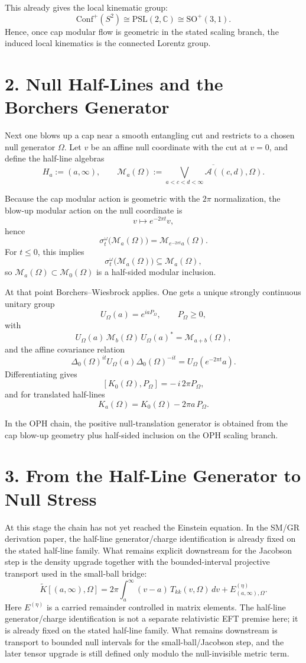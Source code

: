 \documentclass[10pt]{article}
\newcommand{\Conf}{\mathrm{Conf}}
\begin{document}
This already gives the local kinematic group:
\[
\Conf^+(S^2) \cong \mathrm{PSL}(2,\mathbb C) \cong \mathrm{SO}^+(3,1).
\]
Hence, once cap modular flow is geometric in the stated scaling branch, the induced local kinematics is the connected Lorentz group.

\section*{2. Null Half-Lines and the Borchers Generator}

Next one blows up a cap near a smooth entangling cut and restricts to a chosen null generator \(\Omega\). Let \(v\) be an affine null coordinate with the cut at \(v=0\), and define the half-line algebras
\[
H_a := (a,\infty),
\qquad
\mathcal M_a(\Omega)
:=
\overline{\bigvee_{a<c<d<\infty}\mathcal A((c,d),\Omega)}.
\]

Because the cap modular action is geometric with the \(2\pi\) normalization, the blow-up modular action on the null coordinate is
\[
v \mapsto e^{-2\pi t} v,
\]
hence
\[
\sigma_t^\omega\bigl(\mathcal M_a(\Omega)\bigr)
=
\mathcal M_{e^{-2\pi t}a}(\Omega).
\]
For \(t \le 0\), this implies
\[
\sigma_t^\omega\bigl(\mathcal M_a(\Omega)\bigr) \subseteq \mathcal M_a(\Omega),
\]
so \(\mathcal M_a(\Omega) \subset \mathcal M_0(\Omega)\) is a half-sided modular inclusion.

At that point Borchers--Wiesbrock applies. One gets a unique strongly continuous unitary group
\[
U_\Omega(a) = e^{i a P_\Omega},
\qquad
P_\Omega \ge 0,
\]
with
\[
U_\Omega(a)\,\mathcal M_b(\Omega)\,U_\Omega(a)^* = \mathcal M_{a+b}(\Omega),
\]
and the affine covariance relation
\[
\Delta_0(\Omega)^{it} U_\Omega(a)\Delta_0(\Omega)^{-it}
=
U_\Omega(e^{-2\pi t} a).
\]
Differentiating gives
\[
[K_0(\Omega),P_\Omega] = -\,i\,2\pi P_\Omega,
\]
and for translated half-lines
\[
K_a(\Omega)=K_0(\Omega)-2\pi a\,P_\Omega.
\]

In the OPH chain, the positive null-translation generator is obtained from the cap blow-up geometry plus half-sided inclusion on the OPH scaling branch.

\section*{3. From the Half-Line Generator to Null Stress}

At this stage the chain has not yet reached the Einstein equation. In the SM/GR derivation paper, the half-line generator/charge identification is already fixed on the stated half-line family. What remains explicit downstream for the Jacobson step is the density upgrade together with the bounded-interval projective transport used in the small-ball bridge:
\[
\widetilde K[(a,\infty),\Omega]
=
2\pi\int_a^\infty (v-a)\,T_{kk}(v,\Omega)\,dv
+
E^{(\eta)}_{(a,\infty),\Omega}.
\]
Here \(E^{(\eta)}\) is a carried remainder controlled in matrix elements. The half-line generator/charge identification is not a separate relativistic EFT premise here; it is already fixed on the stated half-line family. What remains downstream is transport to bounded null intervals for the small-ball/Jacobson step, and the later tensor upgrade is still defined only modulo the null-invisible metric term.
\end{document}

